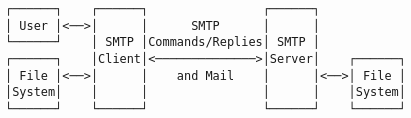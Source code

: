 \documentclass[varwidth=25cm,crop]{standalone}
\begin{document}
\begin{verbatim}
┌──────┐    ┌──────┐                ┌──────┐
│ User │<──>│      │      SMTP      │      │
└──────┘    │ SMTP │Commands/Replies│ SMTP │
┌──────┐    │Client│<──────────────>│Server│    ┌──────┐
│ File │<──>│      │    and Mail    │      │<──>│ File │
│System│    │      │                │      │    │System│
└──────┘    └──────┘                └──────┘    └──────┘
\end{verbatim}
\end{document}
